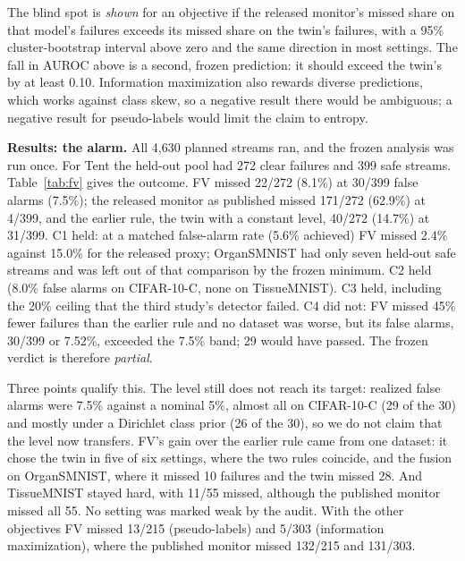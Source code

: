 \documentclass[runningheads]{llncs}
\begin{document}
The blind spot is \emph{shown} for an objective if the released monitor's missed share on that model's failures exceeds its missed share on the twin's failures, with a 95\% cluster-bootstrap interval above zero and the same direction in most settings. The fall in AUROC above is a second, frozen prediction: it should exceed the twin's by at least 0.10. Information maximization also rewards diverse predictions, which works against class skew, so a negative result there would be ambiguous; a negative result for pseudo-labels would limit the claim to entropy.

\textbf{Results: the alarm.} All 4,630 planned streams ran, and the frozen analysis was run once. For Tent the held-out pool had 272 clear failures and 399 safe streams. Table~\ref{tab:fv} gives the outcome. FV missed 22/272 (8.1\%) at 30/399 false alarms (7.5\%); the released monitor as published missed 171/272 (62.9\%) at 4/399, and the earlier rule, the twin with a constant level, 40/272 (14.7\%) at 31/399. C1 held: at a matched false-alarm rate (5.6\% achieved) FV missed 2.4\% against 15.0\% for the released proxy; OrganSMNIST had only seven held-out safe streams and was left out of that comparison by the frozen minimum. C2 held (8.0\% false alarms on CIFAR-10-C, none on TissueMNIST). C3 held, including the 20\% ceiling that the third study's detector failed. C4 did not: FV missed 45\% fewer failures than the earlier rule and no dataset was worse, but its false alarms, 30/399 or 7.52\%, exceeded the 7.5\% band; 29 would have passed. The frozen verdict is therefore \emph{partial}.

Three points qualify this. The level still does not reach its target: realized false alarms were 7.5\% against a nominal 5\%, almost all on CIFAR-10-C (29 of the 30) and mostly under a Dirichlet class prior (26 of the 30), so we do not claim that the level now transfers. FV's gain over the earlier rule came from one dataset: it chose the twin in five of six settings, where the two rules coincide, and the fusion on OrganSMNIST, where it missed 10 failures and the twin missed 28. And TissueMNIST stayed hard, with 11/55 missed, although the published monitor missed all 55. No setting was marked weak by the audit. With the other objectives FV missed 13/215 (pseudo-labels) and 5/303 (information maximization), where the published monitor missed 132/215 and 131/303.
\end{document}

